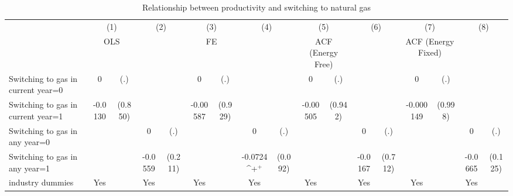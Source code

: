 \begin{table}[htbp]\centering
\def\sym#1{\ifmmode^{#1}\else\(^{#1}\)\fi}
\caption{Relationship between productivity and switching to natural gas}
\begin{tabular}{l*{8}{cc}}
\toprule
                    &\multicolumn{2}{c}{(1)}           &\multicolumn{2}{c}{(2)}           &\multicolumn{2}{c}{(3)}           &\multicolumn{2}{c}{(4)}           &\multicolumn{2}{c}{(5)}           &\multicolumn{2}{c}{(6)}           &\multicolumn{2}{c}{(7)}           &\multicolumn{2}{c}{(8)}           \\
                    &\multicolumn{2}{c}{OLS}           &\multicolumn{2}{c}{}              &\multicolumn{2}{c}{FE}            &\multicolumn{2}{c}{}              &\multicolumn{2}{c}{ACF (Energy Free)}&\multicolumn{2}{c}{}              &\multicolumn{2}{c}{ACF (Energy Fixed)}&\multicolumn{2}{c}{}              \\
\midrule
Switching to gas in current year=0&           0         &         (.)&                     &            &           0         &         (.)&                     &            &           0         &         (.)&                     &            &           0         &         (.)&                     &            \\
Switching to gas in current year=1&     -0.0130         &     (0.850)&                     &            &    -0.00587         &     (0.929)&                     &            &    -0.00505         &     (0.942)&                     &            &   -0.000149         &     (0.998)&                     &            \\
Switching to gas in any year=0&                     &            &           0         &         (.)&                     &            &           0         &         (.)&                     &            &           0         &         (.)&                     &            &           0         &         (.)\\
Switching to gas in any year=1&                     &            &     -0.0559         &     (0.211)&                     &            &     -0.0724\sym{+}  &     (0.092)&                     &            &     -0.0167         &     (0.712)&                     &            &     -0.0665         &     (0.125)\\
industry dummies    &         Yes         &            &         Yes         &            &         Yes         &            &         Yes         &            &         Yes         &            &         Yes         &            &         Yes         &            &         Yes         &            \\

\end{tabular}
\end{table}
